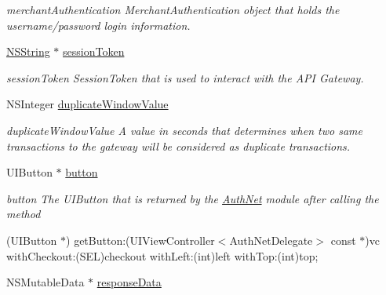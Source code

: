 \begin{DoxyCompactItemize}
\begin{DoxyCompactList}\small\item\em merchantAuthentication MerchantAuthentication object that holds the username/password login information. \item\end{DoxyCompactList}\item 
\hypertarget{interface_auth_net_a98feb2cfaa5eefb0a6ae11a62e8688d2}{
\hyperlink{class_n_s_string}{NSString} $\ast$ \hyperlink{interface_auth_net_a98feb2cfaa5eefb0a6ae11a62e8688d2}{sessionToken}}
\label{interface_auth_net_a98feb2cfaa5eefb0a6ae11a62e8688d2}

\begin{DoxyCompactList}\small\item\em sessionToken SessionToken that is used to interact with the API Gateway. \item\end{DoxyCompactList}\item 
\hypertarget{interface_auth_net_aeae52b6e46a10a90aeea3b6e5228e2ea}{
NSInteger \hyperlink{interface_auth_net_aeae52b6e46a10a90aeea3b6e5228e2ea}{duplicateWindowValue}}
\label{interface_auth_net_aeae52b6e46a10a90aeea3b6e5228e2ea}

\begin{DoxyCompactList}\small\item\em duplicateWindowValue A value in seconds that determines when two same transactions to the gateway will be considered as duplicate transactions. \item\end{DoxyCompactList}\item 
\hypertarget{interface_auth_net_af93902fc8e52ec2765adb22891d98391}{
UIButton $\ast$ \hyperlink{interface_auth_net_af93902fc8e52ec2765adb22891d98391}{button}}
\label{interface_auth_net_af93902fc8e52ec2765adb22891d98391}

\begin{DoxyCompactList}\small\item\em button The UIButton that is returned by the \hyperlink{interface_auth_net}{AuthNet} module after calling the method
\begin{DoxyItemize}
\item (UIButton $\ast$) getButton:(UIViewController$<$AuthNetDelegate$>$ const $\ast$)vc withCheckout:(SEL)checkout withLeft:(int)left withTop:(int)top; 
\end{DoxyItemize}\item\end{DoxyCompactList}\item 
\hypertarget{interface_auth_net_a295493a56ba8823b0a751a159abff7f6}{
NSMutableData $\ast$ \hyperlink{interface_auth_net_a295493a56ba8823b0a751a159abff7f6}{responseData}}
\label{interface_auth_net_a295493a56ba8823b0a751a159abff7f6}


\end{DoxyCompactItemize}
